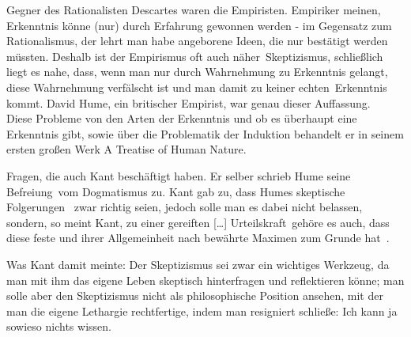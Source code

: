 \documentclass[12pt,a4paper]{article}
\begin{document}
Gegner des Rationalisten Descartes waren die Empiristen. Empiriker meinen, Erkenntnis könne (nur) durch Erfahrung gewonnen werden - im Gegensatz zum Rationalismus, der lehrt man habe angeborene Ideen, die nur bestätigt werden müssten. Deshalb ist der Empirismus oft auch \glqq näher\grqq\  Skeptizismus, schließlich liegt es nahe, dass, wenn man nur durch Wahrnehmung zu Erkenntnis gelangt, diese Wahrnehmung verfälscht ist und man damit zu keiner \glqq echten\grqq\ Erkenntnis kommt. David Hume, ein britischer Empirist, war genau dieser Auffassung.\\ %
Diese Probleme von den Arten der Erkenntnis und ob es überhaupt eine Erkenntnis gibt, sowie über die Problematik der Induktion behandelt er in seinem ersten großen Werk \glqq A Treatise of Human Nature\grqq.

Fragen, die auch Kant beschäftigt haben. Er selber schrieb Hume seine \glqq Befreiung\grqq\ vom Dogmatismus zu. Kant gab zu, dass Humes skeptische Folgerungen%
\ zwar richtig seien, jedoch solle man es dabei nicht belassen, sondern, so meint Kant, zu einer  \glqq gereiften [\ldots] Urteilskraft\grqq\ gehöre es auch, dass diese \glqq feste und ihrer Allgemeinheit nach bewährte Maximen zum Grunde hat\grqq\ \cite{kritik}.

Was Kant damit meinte: Der Skeptizismus sei zwar ein wichtiges Werkzeug, da man mit ihm das eigene Leben skeptisch hinterfragen und reflektieren könne; man solle aber den Skeptizismus nicht als philosophische Position ansehen, mit der man die eigene Lethargie rechtfertige, indem man resigniert schließe: \glqq Ich kann ja sowieso nichts wissen\grqq .
%
\end{document}
